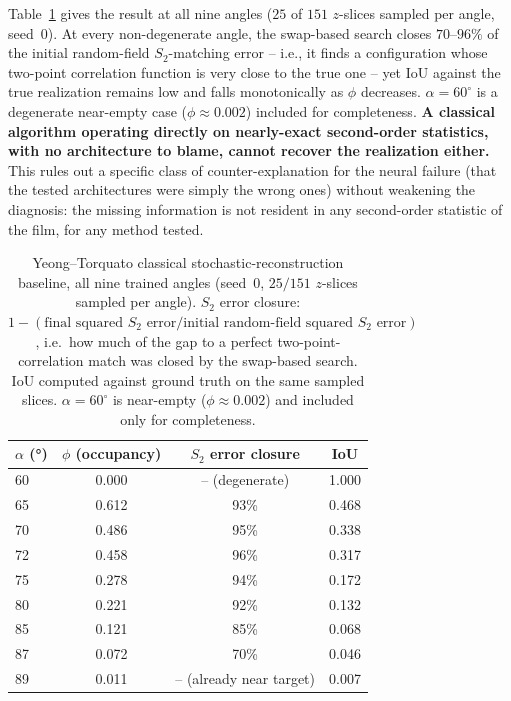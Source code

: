 \documentclass[aip,amsmath,amssymb,reprint]{revtex4-1}
\renewcommand{\ang}{\ensuremath{\alpha}} %
\begin{document}
Table~\ref{tab:yt_baseline} gives the result at all nine angles ($25$ of
$151$ $z$-slices sampled per angle, seed~0). At every non-degenerate angle,
the swap-based search closes $70$--$96\%$ of the initial random-field
$S_2$-matching error -- i.e., it finds a configuration whose two-point
correlation function is very close to the true one -- yet IoU against the
true realization remains low and falls monotonically as $\phi$ decreases.
$\ang=60^{\circ}$ is a degenerate near-empty case ($\phi\!\approx\!0.002$)
included for completeness. \textbf{A classical algorithm operating directly
on nearly-exact second-order statistics, with no architecture to blame,
cannot recover the realization either.} This rules out a specific class of
counter-explanation for the neural failure (that the tested architectures
were simply the wrong ones) without weakening the diagnosis: the missing
information is not resident in any second-order statistic of the film, for
any method tested.

\begin{table}[htbp]
  \centering
  \caption{%
    Yeong--Torquato classical stochastic-reconstruction baseline, all nine
    trained angles (seed~0, $25/151$ $z$-slices sampled per angle).
    $S_2$ error closure: $1 - (\text{final squared } S_2 \text{ error} /
    \text{initial random-field squared } S_2 \text{ error})$, i.e.\ how much
    of the gap to a perfect two-point-correlation match was closed by the
    swap-based search. IoU computed against ground truth on the same
    sampled slices. $\ang=60^{\circ}$ is near-empty
    ($\phi\!\approx\!0.002$) and included only for completeness.
  }
  \label{tab:yt_baseline}
  \begin{tabular}{lccc}
    \toprule
    $\ang$ (°) & $\phi$ (occupancy) & $S_2$ error closure & IoU \\
    \midrule
    60 & 0.000 & --  (degenerate) & 1.000 \\
    65 & 0.612 & 93\% & 0.468 \\
    70 & 0.486 & 95\% & 0.338 \\
    72 & 0.458 & 96\% & 0.317 \\
    75 & 0.278 & 94\% & 0.172 \\
    80 & 0.221 & 92\% & 0.132 \\
    85 & 0.121 & 85\% & 0.068 \\
    87 & 0.072 & 70\% & 0.046 \\
    89 & 0.011 & -- (already near target) & 0.007 \\
    \bottomrule
  \end{tabular}
\end{table}
\end{document}
